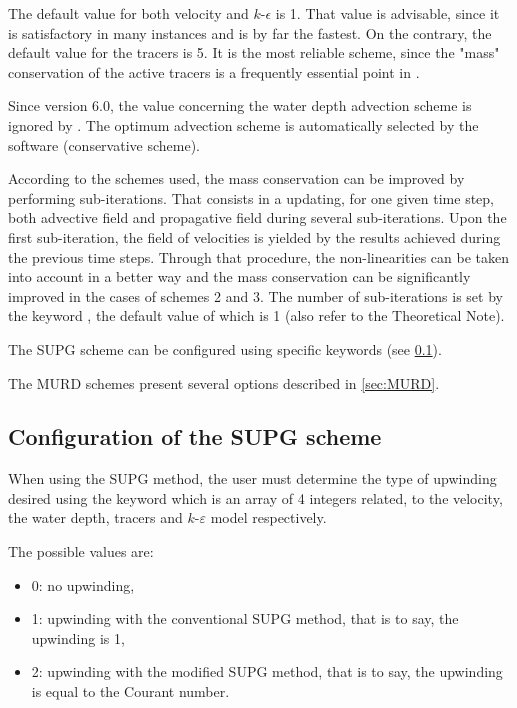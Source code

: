 The default value for both velocity and $k$-$\epsilon$ is 1. That value
is advisable, since it is satisfactory in many instances and is by far the
fastest. On the contrary, the default value for the tracers is 5. It is the
most reliable scheme, since the "mass" conservation of the active tracers is a
frequently essential point in .

Since version 6.0, the value concerning the water depth advection scheme is
ignored by . The optimum advection scheme is automatically selected
by the software (conservative scheme).

According to the schemes used, the mass conservation can be improved by
performing sub-iterations. That consists in a updating, for one given time
step, both advective field and propagative field during several sub-iterations.
Upon the first sub-iteration, the field of velocities is yielded by the results
achieved during the previous time steps. Through that procedure, the
non-linearities can be taken into account in a better way and the mass
conservation can be significantly improved in the cases of schemes 2 and 3. The
number of sub-iterations is set by the keyword , the default value of which is 1 (also refer to the
Theoretical Note).

The SUPG scheme can be configured using specific keywords (see \ref{sec:supg}).

The MURD schemes present several options described in \ref{sec:MURD}.

\subsection{Configuration of the SUPG scheme}
\label{sec:supg}
When using the SUPG method, the user must determine the type of upwinding
desired using the keyword  which is an array of
4 integers related, to the velocity, the water depth, tracers and
$k$-$\varepsilon $ model respectively.

The possible values are:

\begin{itemize}
\item 0: no upwinding,

\item 1: upwinding with the conventional SUPG method, that is to say, the
upwinding is 1,

\item 2: upwinding with the modified SUPG method, that is to say, the
upwinding is equal to the Courant number.
\end{itemize}

